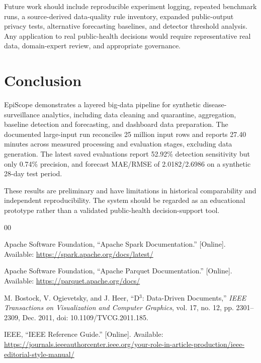 ﻿\documentclass[conference]{IEEEtran}
\begin{document}
Future work should include reproducible experiment logging, repeated benchmark runs, a source-derived data-quality rule inventory, expanded public-output privacy tests, alternative forecasting baselines, and detector threshold analysis. Any application to real public-health decisions would require representative real data, domain-expert review, and appropriate governance.

\section{Conclusion}

EpiScope demonstrates a layered big-data pipeline for synthetic disease-surveillance analytics, including data cleaning and quarantine, aggregation, baseline detection and forecasting, and dashboard data preparation. The documented large-input run reconciles 25 million input rows and reports 27.40 minutes across measured processing and evaluation stages, excluding data generation. The latest saved evaluations report 52.92\% detection sensitivity but only 0.74\% precision, and forecast MAE/RMSE of 2.0182/2.6986 on a synthetic 28-day test period.

These results are preliminary and have limitations in historical comparability and independent reproducibility. The system should be regarded as an educational prototype rather than a validated public-health decision-support tool.

\begin{thebibliography}{00}

Apache Software Foundation, ``Apache Spark Documentation.''
[Online]. Available: \url{https://spark.apache.org/docs/latest/}

Apache Software Foundation, ``Apache Parquet Documentation.''
[Online]. Available: \url{https://parquet.apache.org/docs/}

M. Bostock, V. Ogievetsky, and J. Heer, ``D$^3$: Data-Driven Documents,''
\emph{IEEE Transactions on Visualization and Computer Graphics},
vol. 17, no. 12, pp. 2301--2309, Dec. 2011,
doi: 10.1109/TVCG.2011.185.

IEEE, ``IEEE Reference Guide.'' [Online]. Available:
\url{https://journals.ieeeauthorcenter.ieee.org/your-role-in-article-production/ieee-editorial-style-manual/}

\end{thebibliography}

\clearpage
\onecolumn
\end{document}

